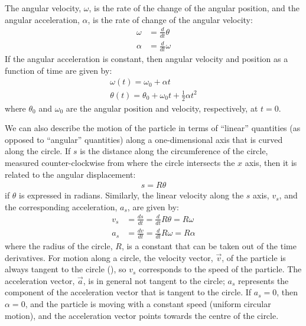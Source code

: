 The angular velocity, $\omega$, is the rate of the change of the angular position, and the angular acceleration, $\alpha$, is the rate of change of the angular velocity:
\begin{align*}
\omega &= \frac{d}{dt}\theta \\
\alpha &= \frac{d}{dt}\omega
\end{align*}
If the angular acceleration is constant, then angular velocity and position as a function of time are given by:
\begin{align*}
\omega(t) = \omega_0+\alpha t\\
\theta(t) = \theta_0+\omega_0 t+\frac{1}{2}\alpha t^2
\end{align*}
where $\theta_0$ and $\omega_0$ are the angular position and velocity, respectively, at $t=0$.

We can also describe the motion of the particle in terms of ``linear'' quantities (as opposed to ``angular'' quantities) along a one-dimensional axis that is curved along the circle. If $s$ is the distance along the circumference of the circle, measured counter-clockwise from where the circle intersects the $x$ axis, then it is related to the angular displacement:
\begin{align*}
s = R\theta
\end{align*}
if $\theta$ is expressed in radians. Similarly, the linear velocity along the $s$ axis, $v_s$, and the corresponding acceleration, $a_s$, are given by:
\begin{align*}
v_s &= \frac{ds}{dt} =\frac{d}{dt}R\theta = R\omega\\
a_s&= \frac{dv}{dt} =\frac{d}{dt}R\omega = R\alpha
\end{align*}
where the radius of the circle, $R$, is a constant that can be taken out of the time derivatives. For motion along a circle, the velocity vector, $\vec v$, of the particle is always tangent to the circle (\href{\#fig:rotationaldynamics:vcircle}{}), so $v_s$ corresponds to the speed of the particle. The acceleration vector, $\vec a$, is in general not tangent to the circle; $a_s$ represents the component of the acceleration vector that is tangent to the circle. If $a_s=0$, then $\alpha=0$, and the particle is moving with a constant speed (uniform circular motion), and the acceleration vector points towards the centre of the circle.

